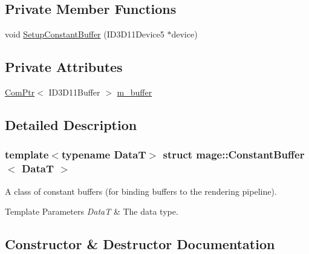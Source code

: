 \subsection*{Private Member Functions}
\begin{DoxyCompactItemize}
\item 
void \hyperlink{structmage_1_1_constant_buffer_a52e82d01bd000ff314c33bfdc350c67e}{Setup\+Constant\+Buffer} (I\+D3\+D11\+Device5 $\ast$device)
\end{DoxyCompactItemize}
\subsection*{Private Attributes}
\begin{DoxyCompactItemize}
\item 
\hyperlink{namespacemage_ae74f374780900893caa5555d1031fd79}{Com\+Ptr}$<$ I\+D3\+D11\+Buffer $>$ \hyperlink{structmage_1_1_constant_buffer_a394571e3102fe053f3357e2e218c0eda}{m\+\_\+buffer}
\end{DoxyCompactItemize}


\subsection{Detailed Description}
\subsubsection*{template$<$typename DataT$>$\newline
struct mage\+::\+Constant\+Buffer$<$ Data\+T $>$}

A class of constant buffers (for binding buffers to the rendering pipeline).


\begin{DoxyTemplParams}{Template Parameters}
{\em DataT} & The data type. \\
\hline
\end{DoxyTemplParams}


\subsection{Constructor \& Destructor Documentation}
\hypertarget{structmage_1_1_constant_buffer_a3badd88f8570d6622f6eb33c7420a87d}{}\label{structmage_1_1_constant_buffer_a3badd88f8570d6622f6eb33c7420a87d} 
